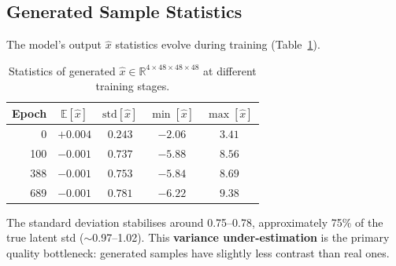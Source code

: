 \subsection{Generated Sample Statistics}

The model's output $\hat{x}$ statistics evolve during training
(Table~\ref{tab:xhat}).

\begin{table}[ht]
\centering
\caption{Statistics of generated $\hat{x} \in \mathbb{R}^{4 \times 48 \times 48 \times 48}$ at different training stages.}
\label{tab:xhat}
\begin{tabular}{rcccc}
\toprule
\textbf{Epoch} & $\mathbb{E}[\hat{x}]$ & $\mathrm{std}[\hat{x}]$ & $\min[\hat{x}]$ & $\max[\hat{x}]$ \\
\midrule
0   & $+0.004$ & $0.243$ & $-2.06$ & $3.41$ \\
100 & $-0.001$ & $0.737$ & $-5.88$ & $8.56$ \\
388 & $-0.001$ & $0.753$ & $-5.84$ & $8.69$ \\
689 & $-0.001$ & $0.781$ & $-6.22$ & $9.38$ \\
\bottomrule
\end{tabular}
\end{table}

The standard deviation stabilises around 0.75--0.78, approximately 75\% of the
true latent std (${\sim}$0.97--1.02).  This \textbf{variance under-estimation}
is the primary quality bottleneck: generated samples have slightly less contrast
than real ones.
